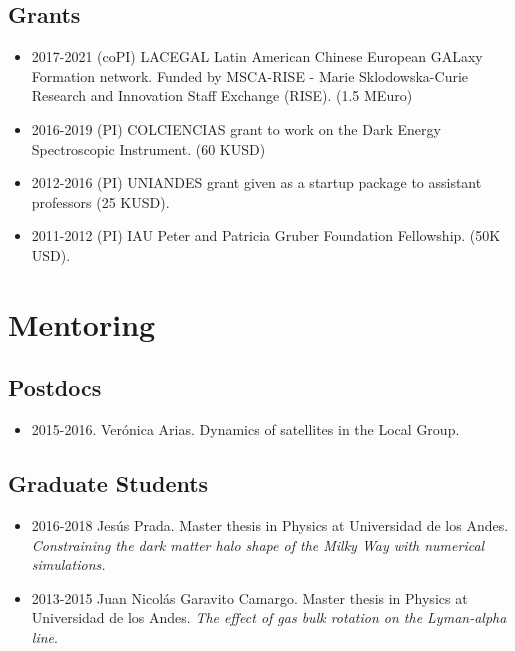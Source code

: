 \documentclass[a4paper,10pt]{article} %
\begin{document}
\subsection{Grants}
\begin{itemize}
\item 2017-2021 (coPI) LACEGAL Latin American Chinese European GALaxy Formation network.
Funded by MSCA-RISE - Marie Sklodowska-Curie Research and Innovation Staff Exchange (RISE). (1.5 MEuro)
\item 2016-2019 (PI) COLCIENCIAS grant to work on the Dark
  Energy Spectroscopic Instrument. (60 KUSD)
\item 2012-2016 (PI) UNIANDES grant given as a startup package to
assistant professors (25 KUSD).
\item 2011-2012 (PI) IAU Peter and Patricia Gruber Foundation
  Fellowship. (50K USD).
\end{itemize}

\color{red}
\section{Mentoring}
\color{black}

\subsection{Postdocs}

\begin{itemize}
\item 2015-2016. Ver\'onica Arias. Dynamics of satellites in the
  Local Group.  
\end{itemize}

\subsection{Graduate Students}

\begin{itemize}

\item 2016-2018 Jes\'us Prada.
  Master thesis in Physics at Universidad de los Andes.
\emph{Constraining the dark matter halo shape of the Milky Way with
  numerical simulations.} 
\item 2013-2015 Juan Nicol\'as Garavito Camargo. Master
  thesis in Physics at Universidad de los Andes. \emph{The effect of
    gas bulk rotation on the Lyman-alpha line}.
\end{itemize}
\end{document}
